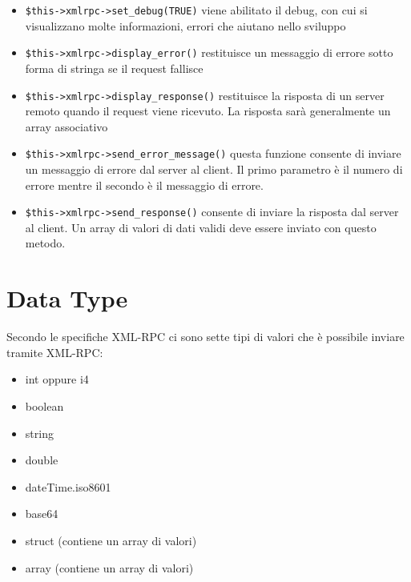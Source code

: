 \begin{itemize}
\item \verb|$this->xmlrpc->set_debug(TRUE)| viene abilitato il debug, con cui si visualizzano molte informazioni, errori che aiutano nello sviluppo

\item \verb|$this->xmlrpc->display_error()| restituisce un messaggio di errore sotto forma di stringa se il request fallisce


\item \verb|$this->xmlrpc->display_response()| restituisce la risposta di un server remoto quando il request viene ricevuto. La risposta sarà generalmente un array associativo


\item \verb|$this->xmlrpc->send_error_message()| questa funzione consente di inviare un messaggio di errore dal server al client. Il primo parametro è il numero di errore mentre il secondo è il messaggio di errore.


\item \verb|$this->xmlrpc->send_response()| consente di inviare la risposta dal server al client. Un array di valori di dati validi deve essere inviato con questo metodo.

\end{itemize}

\section*{Data Type}
Secondo le specifiche XML-RPC ci sono sette tipi di valori che è possibile inviare tramite XML-RPC:

\begin{itemize}
\item int oppure i4
\item boolean
\item string
\item double
\item dateTime.iso8601
\item base64
\item struct (contiene un array di valori)
\item array (contiene un array di valori) 
\end{itemize}